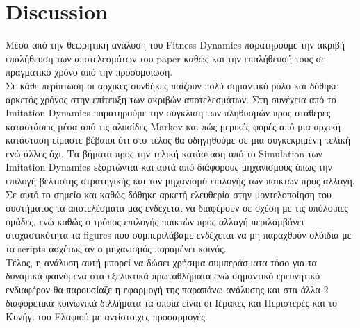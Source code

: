 \chapter{Discussion}
Μέσα από την θεωρητική ανάλυση του Fitness Dynamics παρατηρούμε την ακριβή επαλήθευση των αποτελεσμάτων του paper καθώς και την επαλήθευσή τους σε πραγματικό χρόνο από την προσομοίωση. 
\\

Σε κάθε περίπτωση οι αρχικές συνθήκες παίζουν πολύ σημαντικό ρόλο και δόθηκε αρκετός χρόνος στην επίτευξη των ακριβών αποτελεσμάτων. Στη συνέχεια από το Imitation Dynamics παρατηρούμε την σύγκλιση των πληθυσμών προς σταθερές καταστάσεις μέσα από τις αλυσίδες Markov και πώς μερικές φορές από μια αρχική κατάσταση είμαστε βέβαιοι ότι στο τέλος θα οδηγηθούμε σε μια συγκεκριμένη τελική ενώ άλλες όχι. Τα βήματα προς την τελική κατάσταση από το Simulation των Imitation Dynamics εξαρτώνται και αυτά από διάφορους μηχανισμούς όπως την επιλογή βέλτιστης στρατηγικής και τον μηχανισμό επιλογής των παικτών προς αλλαγή. Σε αυτό το σημείο και καθώς δόθηκε αρκετή ελευθερία στην μοντελοποίηση του συστήματος τα αποτελέσματα μας ενδέχεται να διαφέρουν σε σχέση με τις υπόλοιπες ομάδες, ενώ καθώς ο τρόπος επιλογής παικτών προς αλλαγή περιλαμβάνει στοχαστικότητα τα figures που συμπεριλάβαμε ενδέχεται να μη παραχθούν ολόιδια με τα scripts ασχέτως αν ο μηχανισμός παραμένει κοινός.\\ 
Τέλος, η ανάλυση αυτή μπορεί να δώσει χρήσιμα συμπεράσματα τόσο για τα δυναμικά φαινόμενα στα εξελικτικά πρωταθλήματα ενώ σημαντικό ερευνητικό ενδιαφέρον θα παρουσίαζε η εφαρμογή της παραπάνω ανάλυσης και στα άλλα 2 διαφορετικά κοινωνικά διλλήματα τα οποία είναι οι Ιέρακες και Περιστερές και το Κυνήγι του Ελαφιού με αντίστοιχες προσαρμογές.